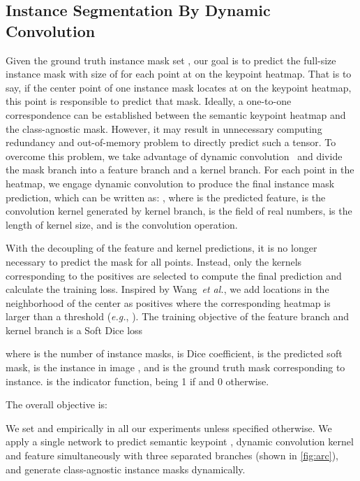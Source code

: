 \documentclass[lettersize,journal]{IEEEtran}
\newcommand{\etal}{{\textit{et al.}}}
\newcommand{\eg}{{\textit{e.g.}}, }
\begin{document}
\subsection{Instance Segmentation By Dynamic Convolution}
Given the ground truth instance mask set , our goal is to predict the full-size instance mask  with size of  for each point at  on the keypoint heatmap. That is to say, if the center point of one instance mask locates at  on the keypoint heatmap, this point is responsible to predict that mask. 
Ideally, a one-to-one correspondence can be established between the semantic keypoint heatmap and the class-agnostic mask. However, it may result in unnecessary computing redundancy and out-of-memory problem to directly predict such a tensor. To overcome this problem, we take advantage of dynamic convolution~\cite{condinst,solov2} and divide the mask branch into a feature branch and a kernel branch. For each point in the heatmap, we engage dynamic convolution to produce the final instance mask prediction, which can be written as:
,
where  is the predicted feature,  is the convolution kernel generated by kernel branch,  is the field of real numbers,  is the length of kernel size, and  is the convolution operation. 

With the decoupling of the feature and kernel predictions, it is no longer necessary to predict the mask for all points. Instead, only the kernels corresponding to the positives are selected to compute the final prediction and calculate the training loss. Inspired by Wang~\etal\cite{solo}, we add locations in the neighborhood of the center as positives where the corresponding heatmap is larger than a threshold  (\eg ). The training objective of the feature branch and kernel branch is a Soft Dice loss~\cite{vnet}

where  is the number of instance masks,  is Dice coefficient,  is the predicted soft mask,  is the  instance in image , and  is the ground truth mask corresponding to  instance.  is the indicator function, being 1 if  and 0 otherwise.

The overall objective is:

We set  and  empirically in all our experiments unless specified otherwise. We apply a single network to predict semantic keypoint , dynamic convolution kernel  and feature  simultaneously with three separated branches (shown in \autoref{fig:arc}), and generate class-agnostic instance masks  dynamically. 
\end{document}
